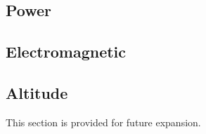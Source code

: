 \subsection{Power}
\label{lab:ssec_Power}




\subsection{Electromagnetic}
\label{lab:ssec_Electromagnetic}





\subsection{Altitude}
\label{lab:ssec_Altitude}

This section is provided for future expansion.

%

